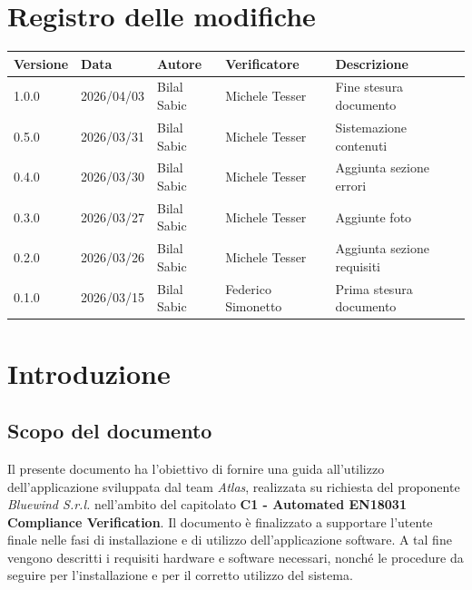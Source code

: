 \documentclass[a4paper,12pt]{article}
\newcommand{\DataUltimaModifica}{2026/04/03}
\begin{document}
\section*{Registro delle modifiche}
\begin{center}
    \begin{tabularx}{\textwidth}{|l|l|l|X|X|}
        \hline
        \rowcolor{lightgray}
        \textbf{Versione}  & \textbf{Data}       & \textbf{Autore}      & \textbf{Verificatore} & \textbf{Descrizione}  \\
        \hline
        1.0.0 & \DataUltimaModifica & Bilal Sabic & Michele Tesser & Fine stesura \newline documento \\
        \hline
        0.5.0 & 2026/03/31 & Bilal Sabic & Michele Tesser & Sistemazione contenuti \\
        \hline
        0.4.0 & 2026/03/30 & Bilal Sabic & Michele Tesser & Aggiunta sezione \newline errori \\
        \hline
        0.3.0 & 2026/03/27 & Bilal Sabic & Michele Tesser & Aggiunte foto \\
        \hline
        0.2.0 & 2026/03/26 & Bilal Sabic & Michele Tesser & Aggiunta sezione \newline requisiti \\
        \hline
        0.1.0 & 2026/03/15 & Bilal Sabic & Federico Simonetto & Prima stesura \newline documento \\
        \hline
    \end{tabularx}
\end{center}

\newpage

\tableofcontents

\newpage

\listoffigures



\newpage

\section{Introduzione}

    \subsection{Scopo del documento}
        Il presente documento ha l'obiettivo di fornire una guida all'utilizzo dell'applicazione sviluppata dal team \textit{Atlas}, realizzata su richiesta del proponente \textit{Bluewind S.r.l.} nell'ambito del capitolato \textbf{C1 - Automated EN18031 Compliance Verification}. \newline
        Il documento è finalizzato a supportare l'utente finale nelle fasi di installazione e di utilizzo dell'applicazione software. A tal fine vengono descritti i requisiti hardware e software necessari, nonché le procedure da seguire per l'installazione e per il corretto utilizzo del sistema.
\end{document}
